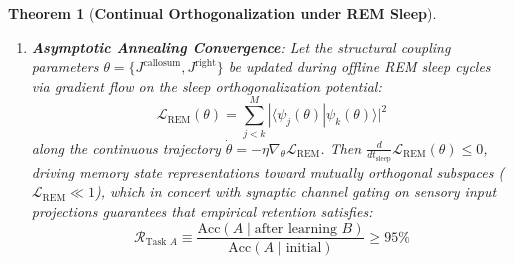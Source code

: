 \documentclass[10pt,twocolumn,3p]{article}
\newtheorem{theorem}{Theorem}
\begin{document}
\begin{theorem}[\textbf{Continual Orthogonalization under REM Sleep}]
\begin{enumerate}
    \item \textbf{Asymptotic Annealing Convergence}:
    Let the structural coupling parameters $\theta = \{J^{\text{callosum}}, J^{\text{right}}\}$ be updated during offline REM sleep cycles via gradient flow on the sleep orthogonalization potential:
    \begin{equation}
        \mathcal{L}_{\text{REM}}(\theta) = \sum_{j < k}^M |\langle \psi_j(\theta) | \psi_k(\theta) \rangle|^2
        \label{eq:L_REM}
    \end{equation}
    along the continuous trajectory $\dot{\theta} = -\eta \nabla_\theta \mathcal{L}_{\text{REM}}$. Then $\frac{d}{dt_{\text{sleep}}} \mathcal{L}_{\text{REM}}(\theta) \le 0$, driving memory state representations toward mutually orthogonal subspaces ($\mathcal{L}_{\text{REM}} \ll 1$), which in concert with synaptic channel gating on sensory input projections guarantees that empirical retention satisfies:
    \begin{equation}
        \mathcal{R}_{\text{Task } A} \equiv \frac{\text{Acc}(A \mid \text{after learning } B)}{\text{Acc}(A \mid \text{initial})} \ge 95\%
        \label{eq:retention_bound}
    \end{equation}
\end{enumerate}
\end{theorem}
\end{document}
